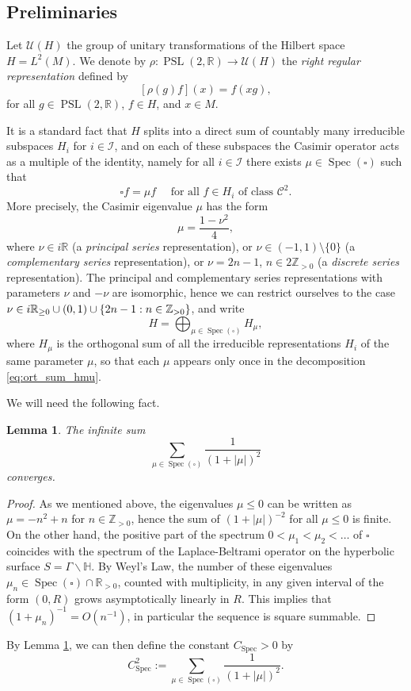 \documentclass[JEP,XML,SOM,NoEqCountersInSection,Unicode,published]{cedram}
\newcommand \R{\mathbb{R}}
\newcommand \Hbb{\mathbb{H}}
\newcommand \Z{\mathbb{Z}}
\DeclareMathOperator{\PSL}{PSL}
\DeclareMathOperator{\Spec}{Spec}
\newtheorem {lemma}[theorem]{Lemma}
\theoremstyle{definition}
\begin{document}
\subsection{Preliminaries}

Let $\mathcal{U}(H)$ the group of unitary transformations of the Hilbert space $H= L^2(M)$.
We denote by $\rho \colon \PSL(2,\R) \to \mathcal{U}(H)$ the \emph{right regular representation} defined by
\[
[\rho(g)f](x) = f(xg),
\]
for all $g \in \PSL(2,\R)$, $f \in H$, and $x \in M$.

It is a standard fact that $H$ splits into a direct sum of countably many irreducible subspaces $H_{i}$ for $i \in \mathcal{I}$, and on each of these subspaces the Casimir operator acts as a multiple of the identity, namely for all $i \in \mathcal{I}$ there exists $\mu \in \Spec(\square)$ such that
\[
\square f = \mu f \quad \text{ for all $f \in H_i$ of class $\mathscr{C}^2$}.
\]
More precisely, the Casimir eigenvalue $\mu$ has the form
\[
\mu = \frac{1-\nu^2}{4},
\]
where $\nu \in i\R$ (a \emph{principal series} representation), or $\nu \in (-1,1) \setminus \{0\}$ (a \emph{complementary series} representation), or $\nu = 2n-1$, $n \in 2\Z_{>0}$ (a \emph{discrete series} representation).
The principal and complementary series representations with parameters $\nu$ and $-\nu$ are isomorphic, hence we can restrict ourselves to the case $\nu \in i\R_{\geq 0} \cup (0,1) \cup\allowbreak \{ 2n-\nobreak 1 :\nobreak n \in\nobreak \Z_{>0}\}$, and write
\begin{equation}\label{eq:ort_sum_hmu}
H= \bigoplus_{\mu \in \Spec(\square)} H_{\mu},
\end{equation}
where $H_\mu$ is the orthogonal sum of all the irreducible representations $H_i$ of the same parameter $\mu$, so that each $\mu$ appears only once in the decomposition \eqref{eq:ort_sum_hmu}.

We will need the following fact.
\begin{lemma}\label{lemma:Weyl}
The infinite sum
\[
\sum_{\mu \in \Spec(\square)} \frac{1}{(1+|\mu|)^2}
\]
converges.
\end{lemma}
\begin{proof}
As we mentioned above, the eigenvalues $\mu \leq 0$ can be written as $\mu = -n^2+n$ for $n \in \Z_{>0}$, hence the sum of $(1+|\mu|)^{-2}$ for all $\mu\leq 0$ is finite.
On the other hand, the positive part of the spectrum $0<\mu_1 <\mu_2< \dots$ of $\square$ coincides with the spectrum of the Laplace-Beltrami operator on the hyperbolic surface $S =\Gamma \backslash \Hbb$. By Weyl's Law, the number of these eigenvalues $\mu_n \in \Spec(\square) \cap \R_{>0}$, counted with multiplicity, in any given interval of the form $(0,R)$ grows asymptotically linearly in $R$. This implies that $(1+\mu_n)^{-1} = O(n^{-1})$, in particular the sequence is square summable.
\end{proof}
By Lemma \ref{lemma:Weyl}, we can then define the constant $C_{\Spec}>0$ by
\[
C^2_{\Spec}:=\sum_{\mu \in \Spec(\square)} \frac{1}{(1+|\mu|)^2}.
\]
\end{document}
